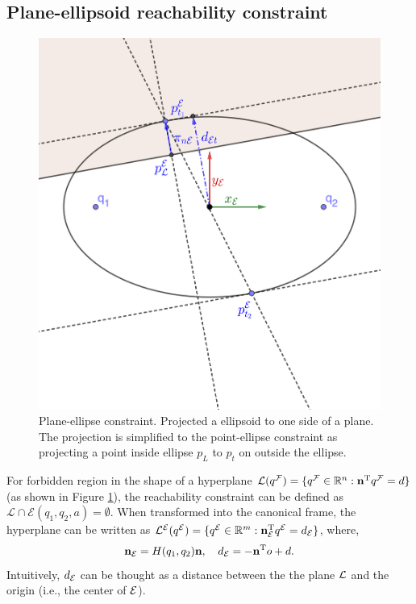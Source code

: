 \documentclass[journal]{IEEEtran}  %
\begin{document}
\subsection{Plane-ellipsoid reachability constraint}\label{sec:ellipsoide-plane}

\begin{figure}[htbp]
\begin{center}
\includegraphics[width=0.6\linewidth, trim = 0.3cm 1cm 0.3cm 1cm, clip]{Ellipse2line_V2}
\caption{Plane-ellipse constraint. Projected a ellipsoid to one side of a plane. The projection is simplified to the point-ellipse constraint as projecting a point inside ellipse $p_{L}$ to $p_{t}$ on outside the ellipse.}
\label{fig:Ellipse-to-plane}
\end{center}
\end{figure}

For forbidden region in the shape of a hyperplane $\mathcal{L}({q^{\mathcal{F}}}) = \{{q^{\mathcal{F}}}\in\mathbb{R}^n: \mathbf{n}^\mathrm{T} {q^{\mathcal{F}}} = d\}$ (as shown in Figure \ref{fig:Ellipse-to-plane}), the reachability constraint can be defined as $\mathcal{L} \cap \mathcal{E}(q_1,q_2,a) = \emptyset$. When transformed into the canonical frame, the hyperplane can be written as ${\mathcal{L}^{\mathcal{E}}}({q^{\mathcal{E}}}) = \{  {q^{\mathcal{E}}}\in\mathbb{R}^m:  \mathbf{n}_{\mathcal{E}}^\mathrm{T} {q^{\mathcal{E}}} = d_{\mathcal{E}}\}$, where,
  \begin{equation}
    \mathbf{n}_{\mathcal{E}} = H(q_1,q_2)\mathbf{n}, \quad d_{\mathcal{E}} =-\mathbf{n}^\mathrm{T} o + d.
\end{equation}
Intuitively, $d_{\mathcal{E}}$ can be thought as a distance between the the plane $\mathcal{L}$ and the origin (i.e., the center of $\mathcal{E}$).
\end{document}
